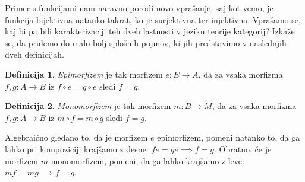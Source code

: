 \documentclass[12pt,a4paper]{book}
\theoremstyle{definition}
\newtheorem{definicija}{Definicija}[chapter]
\theoremstyle{plain}
\theoremstyle{definition}
\theoremstyle{remark}
\begin{document}
Primer s funkcijami nam naravno porodi novo vprašanje, saj kot vemo, je funkcija bijektivna natanko takrat, ko je surjektivna ter injektivna. Vprašamo se, kaj bi pa bili karakterizaciji teh dveh lastnosti v jeziku teorije kategorij? Izkaže se, da pridemo do malo bolj splošnih pojmov, ki jih predstavimo v naslednjih dveh definicijah.

\begin{definicija}
\emph{Epimorfizem} je tak morfizem $e : E \to A$, da za vsaka morfizma $f,g : A \to B$ iz $f \circ e = g \circ e$ sledi $f = g$.
\end{definicija}

\begin{definicija}
\emph{Monomorfizem} je tak morfizem $m : B \to M$, da za vsaka morfizma $f,g : A \to B$ iz $m \circ f = m \circ g$ sledi $f = g$.
\end{definicija}

Algebraično gledano to, da je morfizem $e$ epimorfizem, pomeni natanko to, da ga lahko pri kompoziciji krajšamo z desne: $fe = ge \implies f=g$. Obratno, če je morfizem $m$ monomorfizem, pomeni, da ga lahko krajšamo z leve: $mf = mg \implies f = g$.
\end{document}
